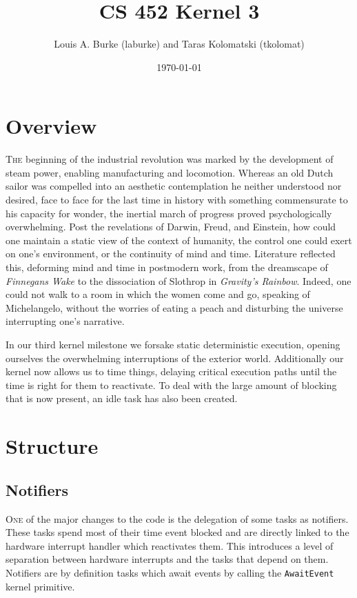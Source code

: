 \documentclass{article}
\title{\vspace{-3.5em}CS 452 Kernel 3}
\author{Louis A. Burke (laburke) and Taras Kolomatski (tkolomat)}
\date{\vspace{-0.9em}\today}
\begin{document}
\begingroup
\let\newpage\relax%
\maketitle
\endgroup

\section*{Overview}

\textsc{The} beginning of the industrial revolution was marked by the development of
steam power, enabling manufacturing and locomotion. Whereas an old Dutch sailor
was compelled into an aesthetic contemplation he neither understood nor desired,
face to face for the last time in history with something commensurate to his
capacity for wonder, the inertial march of progress proved psychologically
overwhelming. Post the revelations of Darwin, Freud, and Einstein, how could one
maintain a static view of the context of humanity, the control one could exert
on one's environment, or the continuity of mind and time. Literature reflected
this, deforming mind and time in postmodern work, from the dreamscape of
\textit{Finnegans Wake} to the dissociation of Slothrop in \textit{Gravity's
Rainbow}. Indeed, one could not walk to a room in which the women come and go,
speaking of Michelangelo, without the worries of eating a peach and disturbing
the universe interrupting one's narrative.

In our third kernel milestone we forsake static deterministic execution, opening
ourselves the overwhelming interruptions of the exterior world. Additionally our
kernel now allows us to time things, delaying critical execution paths until the
time is right for them to reactivate. To deal with the large amount of blocking
that is now present, an idle task has also been created.

\section*{Structure}

\subsection*{Notifiers}

\textsc{One} of the major changes to the code is the delegation of some tasks as
notifiers. These tasks spend most of their time event blocked and are directly
linked to the hardware interrupt handler which reactivates them. This introduces
a level of separation between hardware interrupts and the tasks that depend on
them. Notifiers are by definition tasks which await events by calling the
\texttt{AwaitEvent} kernel primitive.
\end{document}
